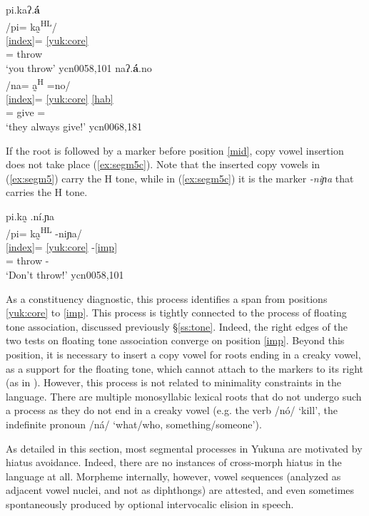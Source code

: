 \documentclass[output=paper]{langscibook}
\begin{document}
\ea \label{ex:segm5}
\ea \label{ex:segm5a}
pi.kaʔ.\textbf{á} \\
\glll /pi= ka̰\textsuperscript{HL}/ \\
      \ref{index}= \ref{yuk:core}  \\
        \Ssg{}= throw\\
    \glt `you throw' \hfill ycn0058,101
\ex \label{ex:segm5b}
naʔ.\textbf{á}.no \\
    \glll /na= a̰\textsuperscript{H} =no/\\
          \ref{index}= \ref{yuk:core} \ref{hab}\\
           \Tpl{}= give =\Hab{}\\
    \glt `they always give!' \hfill ycn0068,181
 \z
 \z
 
If the root is followed by a marker before position \ref{mid}, copy vowel insertion does not take place (\ref{ex:segm5c}). Note that the inserted copy vowels in (\ref{ex:segm5}) carry the H tone, while in (\ref{ex:segm5c}) it is the marker \textit{-niɲa} \Proh{} that carries the H tone. 

\ea \label{ex:segm5c}
pi.ka̰ .ní.ɲa \\
    \glll  /pi= ka̰\textsuperscript{HL} -niɲa/\\
          \ref{index}= \ref{yuk:core} -\ref{imp}\\
           \Ssg{}= throw -\Proh{}\\
    \glt `Don't throw!' \hfill ycn0058,101
\z

As a constituency diagnostic, this process identifies a span from positions \ref{yuk:core} to \ref{imp}. This process is tightly connected to the process of floating tone association, discussed previously §\ref{ss:tone}. Indeed, the right edges of the two tests on floating tone association converge on position \ref{imp}. Beyond this position, it is necessary to insert a copy vowel for roots ending in a creaky vowel, as a support for the floating tone, which cannot attach to the markers to its right (as in ). However, this process is not related to minimality constraints in the language. There are multiple monosyllabic lexical roots that do not undergo such a process as they do not end in a creaky vowel (e.g. the verb /nó/ `kill', the indefinite pronoun /ná/ `what/who, something/someone').

As detailed in this section, most segmental processes in Yukuna  are motivated by hiatus avoidance. Indeed, there are no instances of cross-morph hiatus in the language at all. Morpheme internally, however, vowel sequences (analyzed as adjacent vowel nuclei, and not as diphthongs) are attested, and even sometimes spontaneously produced by optional intervocalic elision in speech. 
\end{document}

